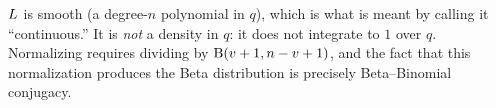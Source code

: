 \begin{remark}
$L$ is smooth (a degree-$n$ polynomial in $q$), which is what is meant by
calling it ``continuous.'' It is \emph{not} a density in $q$: it does not
integrate to $1$ over $q$. Normalizing requires dividing by
$\operatorname{B}(v+1, n-v+1)$, and the fact that this normalization produces the Beta
distribution is precisely Beta--Binomial conjugacy.
\end{remark}
